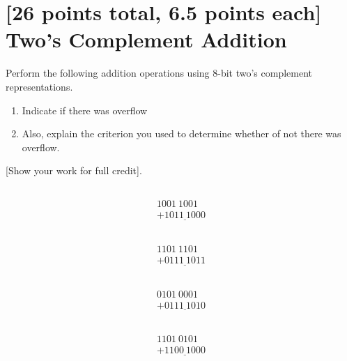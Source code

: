 \documentclass[12pt]{article}
\begin{document}
\section{[26 points total, 6.5 points each] Two's Complement Addition}
Perform the following addition operations using 8-bit two's complement representations.
\begin{enumerate}[label=(\roman*)]
\item Indicate if there was overflow
\item Also, explain the criterion you used to determine whether of not there was overflow.
\end{enumerate}
[Show your work for full credit].
\subsection{}
\begin{equation}
	\begin{split}
		1001\ 1001 \\ + \underline{1011\ 1000}
	\end{split}
\end{equation}

\subsection{}

\begin{equation}
	\begin{split}
		1101\ 1101 \\ + \underline{0111\ 1011}
	\end{split}
\end{equation}

\subsection{}

\begin{equation}
	\begin{split}
		0101\ 0001 \\ + \underline{0111\ 1010}
	\end{split}
\end{equation}

\subsection{}
\begin{equation}
	\begin{split}
		1101\ 0101 \\ + \underline{1100\ 1000}
	\end{split}
\end{equation}
\end{document}
